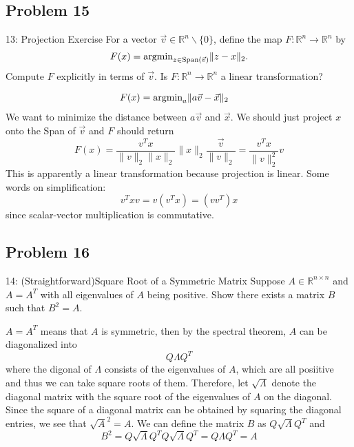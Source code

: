 \documentclass[../main]{subfiles}
\begin{document}
\subsection{Problem 15}

\begin{bbox}{13: Projection Exercise}
    For a vector $\vec v \in \mathbb R^n \backslash \{0\}$, define the map $F: \mathbb R^n \to \mathbb R^n$ by 
    \[
    F(x) = \text{argmin}_{z\in \text{Span}(\vec v)}\|z-x\|_2. 
    \]
    Compute $F$ explicitly in terms of $\vec v$. Is $F: \mathbb R^n \to \mathbb R^n$ a linear transformation?
\end{bbox}
\begin{solution}
    \begin{align*}
        F(x) &= \text{argmin}_{a}\|a\vec v - \vec x\|_2
    \end{align*}
    We want to minimize the distance between $a\vec v$ and $\vec x$. We should just project $x$ onto the Span of $\vec v$ and $F$ should return
    \[
    F(x) = \frac{v^Tx}{\|v\|_2\|x\|_2} \|x\|_2\frac{\vec v}{\|v\|_2} = \frac{v^T x}{\|v\|_2^2}v
    \]
    This is apparently a linear transformation because projection is linear.
    \newline
    Some words on simplification:
    \[
    v^T x v = v(v^T x)=(vv^T)x
    \] since scalar-vector multiplication is commutative.
\end{solution}

\subsection{Problem 16}

\begin{bbox}{14: (Straightforward)Square Root of a Symmetric Matrix}
    Suppose $A \in \mathbb R^{n\times n}$ and $A=A^T$ with all eigenvalues of $A$ being positive. Show there exists a matrix $B$ such that $B^2 = A$.
\end{bbox}
\begin{solution}
    $A=A^T$ means that $A$ is symmetric, then by the spectral theorem, $A$ can be diagonalized into 
    \[
    Q \Lambda Q^T
    \]
    where the digonal of $\Lambda$ consists of the eigenvalues of $A$, which are all posiitive and thus we can take square roots of them. Therefore, let $\sqrt{\Lambda}$ denote the diagonal matrix with the square root of the eigenvalues of $A$ on the diagonal. Since the square of a diagonal matrix can be obtained by squaring the diagonal entries, we see that $\sqrt{A}^2 = A$. We can define the matrix $B$ as $Q\sqrt{\Lambda}Q^T$ and 
    \[
    B^2 = Q\sqrt{\Lambda}Q^TQ\sqrt{\Lambda}Q^T = Q\Lambda Q^T = A
    \]
\end{solution}
\end{document}
